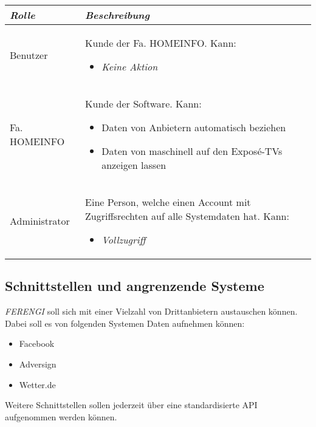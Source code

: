 \documentclass[a4paper]{article}
\begin{document}
	\begin{tabular}{|p{3cm}|p{9cm}|}
	\hline
	\emph{Rolle} & \emph{Beschreibung} \\
	\hline
	Benutzer & Kunde der Fa. HOMEINFO. Kann:
		\begin{itemize}
		\item \emph{Keine Aktion}
		\end{itemize} \\
	\hline
	Fa. HOMEINFO & Kunde der Software. Kann:
		\begin{itemize}
		\item Daten von Anbietern automatisch beziehen
		\item Daten von maschinell auf den Exposé-TVs anzeigen lassen
		\end{itemize} \\
	\hline
	Administrator & Eine Person, welche einen Account mit Zugriffsrechten auf alle Systemdaten hat. Kann:
		\begin{itemize}
		\item \emph{Vollzugriff}
		\end{itemize} \\
	\hline
	\end{tabular}
	
	\pagebreak
		
	\subsection{Schnittstellen und angrenzende Systeme}
	\emph{FERENGI} soll sich mit einer Vielzahl von Drittanbietern austauschen können. Dabei soll es von folgenden Systemen Daten aufnehmen können:
	\begin{itemize}
		\item Facebook
		\item Adversign
		\item Wetter.de
	\end{itemize}
	Weitere Schnittstellen sollen jederzeit über eine standardisierte API aufgenommen werden können.
	
	
\end{document}
